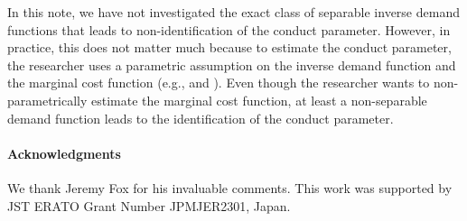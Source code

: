 \documentclass[11pt, a4paper]{article}
\theoremstyle{remark}
\begin{document}
In this note, we have not investigated the exact class of separable inverse demand functions that leads to non-identification of the conduct parameter.
However, in practice, this does not matter much because to estimate the conduct parameter, the researcher uses a parametric assumption on the inverse demand function and the marginal cost function (e.g., \citet{okazaki2022excess} and \citet{matsumura2024loglinear}).
Even though the researcher wants to non-parametrically estimate the marginal cost function, at least a non-separable demand function leads to the identification of the conduct parameter.

\paragraph{Acknowledgments}
We thank Jeremy Fox for his invaluable comments.
This work was supported by JST ERATO Grant Number JPMJER2301, Japan.  


\newpage


\end{document}
